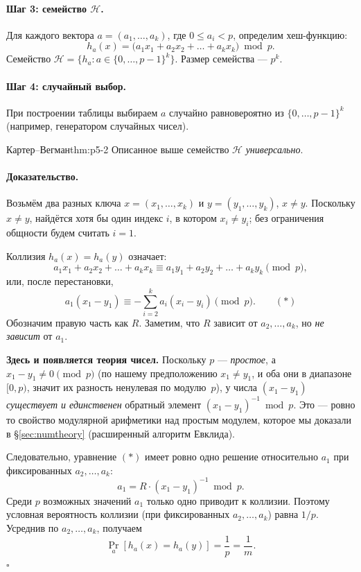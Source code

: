 \paragraph*{Шаг 3: семейство $\mathcal{H}$.} Для каждого вектора $a = (a_1, \dots, a_k)$, где $0 \le a_i < p$, определим хеш-функцию:
\[
  h_a(x) = \big( a_1 x_1 + a_2 x_2 + \dots + a_k x_k \big) \bmod p.
\]
Семейство $\mathcal{H} = \{h_a : a \in \{0, \dots, p-1\}^k\}$. Размер семейства --- $p^k$.

\paragraph*{Шаг 4: случайный выбор.} При построении таблицы выбираем $a$ случайно равновероятно из $\{0, \dots, p-1\}^k$ (например, генератором случайных чисел).

\begin{theorem}{Картер--Вегман}{thm:p5-2}
Описанное выше семейство $\mathcal{H}$ \emph{универсально}.
\end{theorem}

\paragraph*{Доказательство.} Возьмём два разных ключа $x = (x_1, \dots, x_k)$ и $y = (y_1, \dots, y_k)$, $x \ne y$. Поскольку $x \ne y$, найдётся хотя бы один индекс $i$, в котором $x_i \ne y_i$; без ограничения общности будем считать $i = 1$.

Коллизия $h_a(x) = h_a(y)$ означает:
\[
  a_1 x_1 + a_2 x_2 + \dots + a_k x_k \equiv a_1 y_1 + a_2 y_2 + \dots + a_k y_k \pmod p,
\]
или, после перестановки,
\[
  a_1 (x_1 - y_1) \equiv -\sum_{i=2}^{k} a_i (x_i - y_i) \pmod p. \qquad (\ast)
\]
Обозначим правую часть как $R$. Заметим, что $R$ зависит от $a_2, \dots, a_k$, но \emph{не зависит} от $a_1$.

\textbf{Здесь и появляется теория чисел.} Поскольку $p$ --- \emph{простое}, а $x_1 - y_1 \ne 0 \pmod p$ (по нашему предположению $x_1 \ne y_1$, и оба они в диапазоне $[0, p)$, значит их разность ненулевая по модулю~$p$), у числа $(x_1 - y_1)$ \emph{существует и единственен} обратный элемент $(x_1 - y_1)^{-1} \bmod p$. Это --- ровно то свойство модулярной арифметики над простым модулем, которое мы доказали в §\ref{sec:numtheory} (расширенный алгоритм Евклида).

Следовательно, уравнение $(\ast)$ имеет ровно одно решение относительно $a_1$ при фиксированных $a_2, \dots, a_k$:
\[
  a_1 = R \cdot (x_1 - y_1)^{-1} \bmod p.
\]
Среди $p$ возможных значений $a_1$ только одно приводит к коллизии. Поэтому условная вероятность коллизии (при фиксированных $a_2, \dots, a_k$) равна $1/p$. Усреднив по $a_2, \dots, a_k$, получаем
\[
  \Pr_a[h_a(x) = h_a(y)] = \frac{1}{p} = \frac{1}{m}.
\]
\hfill$\square$

